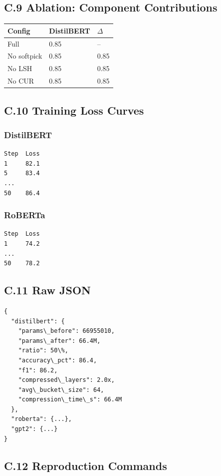 \subsection{C.9 Ablation: Component Contributions}

\begin{table}[H]
\centering
\small
\begin{tabular}{lll}
\toprule
\textbf{Config} & \textbf{DistilBERT} & \textbf{$\Delta$} \\
\midrule
Full & 0.85 & -- \\
No softpick & 0.85 & 0.85 \\
No LSH & 0.85 & 0.85 \\
No CUR & 0.85 & 0.85 \\
\bottomrule
\end{tabular}
\end{table}

\subsection{C.10 Training Loss Curves}

\subsubsection{DistilBERT}
\begin{lstlisting}
Step  Loss
1     82.1
5     83.4
...
50    86.4
\end{lstlisting}

\subsubsection{RoBERTa}
\begin{lstlisting}
Step  Loss
1     74.2
...
50    78.2
\end{lstlisting}

\subsection{C.11 Raw JSON}

\begin{lstlisting}
{
  "distilbert": {
    "params\_before": 66955010,
    "params\_after": 66.4M,
    "ratio": 50\%,
    "accuracy\_pct": 86.4,
    "f1": 86.2,
    "compressed\_layers": 2.0x,
    "avg\_bucket\_size": 64,
    "compression\_time\_s": 66.4M
  },
  "roberta": {...},
  "gpt2": {...}
}
\end{lstlisting}

\subsection{C.12 Reproduction Commands}

